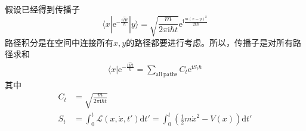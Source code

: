 \documentclass[12pt]{article}
\begin{document}
    假设已经得到传播子
    \begin{equation}
        \langle x | \mathrm{e}^{-\frac {i \hat{H}t}{\hbar}} |y \rangle = \sqrt{\frac m{2\pi \mathrm{i}\hbar t}} \mathrm{e}^{\mathrm{i}\frac {m(x-y)^2}{2t\hbar}}
    \end{equation}
    路径积分是在空间中连接所有$x,y$的路径都要进行考虑。所以，传播子是对所有路径求和
    \begin{equation}\begin{aligned}
        \langle x | \mathrm{e}^{-\frac {i \hat{H}t}{\hbar}} = \sum_{\mathrm{all~paths}} C_t \mathrm{e}^{\mathrm{i}S_t\hbar}
    \end{aligned}\end{equation}
    其中 
    \begin{equation}\begin{aligned}
        C_t &= \sqrt{\frac m{2\pi \mathrm{i}\hbar t}} \\
        S_t &= \int_0^t \mathcal{L}(x,\dot{x},t') \mathrm{d}t' = \int_0^t (\frac 12 m \dot{x}^2 - V(x)) \mathrm{d}t'
    \end{aligned}\end{equation}
\end{document}
